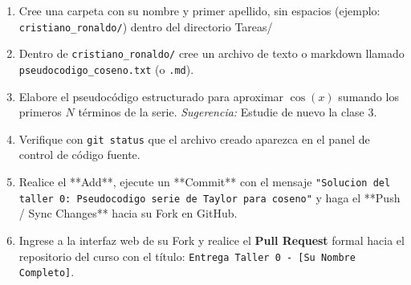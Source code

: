 \documentclass[12pt]{article}
\begin{document}
\begin{problemas}[]
\begin{enumerate}
\begin{enumerate}
    \item Cree una carpeta con su nombre y primer apellido, sin espacios 
    (ejemplo: \texttt{cristiano\_ronaldo/}) dentro del directorio Tareas/ 
    \item Dentro de \texttt{cristiano\_ronaldo/} cree un archivo de texto o markdown 
    llamado \texttt{pseudocodigo\_coseno.txt} (o \texttt{.md}).
    \item Elabore el pseudocódigo estructurado para aproximar $\cos(x)$ 
    sumando los primeros $N$ términos de la serie. \textit{Sugerencia:} 
    Estudie de nuevo la clase 3.
    \item Verifique con \lstinline|git status| que el archivo creado aparezca en 
    el panel de control de código fuente.
    \item Realice el **Add**, ejecute un **Commit** con el mensaje
     \texttt{"Solucion del taller 0: Pseudocodigo serie de Taylor para coseno"} 
     y haga el **Push / Sync Changes** hacia su Fork en GitHub.
    \item Ingrese a la interfaz web de su Fork y realice el 
    \textbf{Pull Request} formal hacia el repositorio del curso 
    con el título: \texttt{Entrega Taller 0 - [Su Nombre Completo]}.
\end{enumerate}




\end{enumerate}
\end{problemas}



\label{LastPage}
\end{document}

